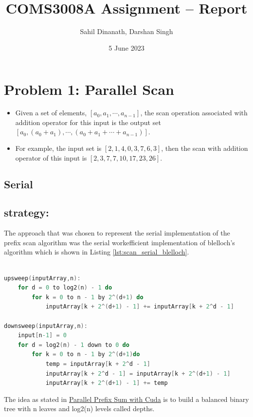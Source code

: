 
\title{COMS3008A Assignment -- Report}
\author{Sahil Dinanath, Darshan Singh}
\date{5 June 2023} 
\maketitle 
\pagestyle{fancy}
\fancyhf{}
\fancyhead[R]{\thepage}
{} 
\section{Problem 1: Parallel Scan}
\begin{itemize}
	\item  Given a set of elements, $[a_0,a_1,\dotsm,a_{n-1}]$, the scan operation associated with addition operator for this input is the output set $[a_0,(a_0+a_1),\dotsm,(a_0+a_1+\dotsm+a_{n-1})]$. 
	\item For example, the input set is $[2,1,4,0,3,7,6,3]$, then the scan with addition operator of this input is $[2,3,7,7,10,17,23,26]$. 
\end{itemize}
\subsection{Serial} 
\subsection*{strategy:}
The approach that was chosen to represent the serial implementation of the prefix scan algorithm was the serial workefficient implementation of blelloch's algorithm which is shown in Listing \ref{lst:scan_serial_blelloch}. 
\begin{lstlisting}[language=C, caption={upsweep and downsweep pseudocode}, label={lst:scan_serial_blelloch}]

upsweep(inputArray,n):
	for d = 0 to log2(n) - 1 do
    	for k = 0 to n - 1 by 2^(d+1) do
        	inputArray[k + 2^(d+1) - 1] += inputArray[k + 2^d - 1]

downsweep(inputArray,n):
	input[n-1] = 0
	for d = log2(n) - 1 down to 0 do 
		for k = 0 to n - 1 by 2^(d+1)do 
			temp = inputArray[k + 2^d - 1] 
			inputArray[k + 2^d - 1] = inputArray[k + 2^(d+1) - 1]
			inputArray[k + 2^(d+1) - 1] += temp

\end{lstlisting}
The idea as stated in \href{https://developer.nvidia.com/gpugems/gpugems3/part-vi-gpu-computing/chapter-39-parallel-prefix-sum-scan-cuda}{Parallel Prefix Sum with Cuda} is to build a balanced binary tree with n leaves and log2(n) levels called depths.

